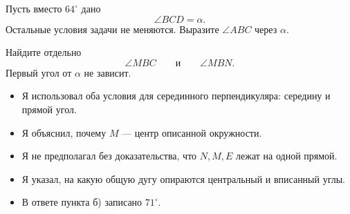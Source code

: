 Пусть вместо \(64^\circ\) дано
\[
\angle BCD=\alpha.
\]
Остальные условия задачи не меняются. Выразите \(\angle ABC\) через \(\alpha\).

\begin{hintbox}
Найдите отдельно
\[
\angle MBC
\qquad\text{и}\qquad
\angle MBN.
\]
Первый угол от \(\alpha\) не зависит.
\end{hintbox}

\answerline[5]

\begin{selfcheck}
\begin{itemize}
  \item[\checkbox] Я использовал оба условия для серединного перпендикуляра:
  середину и прямой угол.
  \item[\checkbox] Я объяснил, почему \(M\) — центр описанной окружности.
  \item[\checkbox] Я не предполагал без доказательства, что \(N,M,E\) лежат
  на одной прямой.
  \item[\checkbox] Я указал, на какую общую дугу опираются центральный и
  вписанный углы.
  \item[\checkbox] В ответе пункта б) записано \(71^\circ\).
\end{itemize}
\end{selfcheck}
